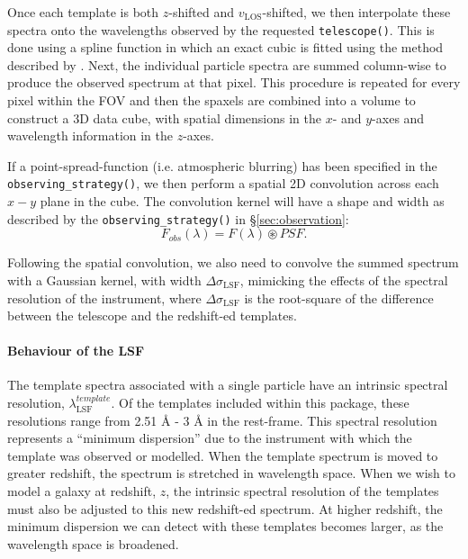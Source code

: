 \documentclass[
  journal=pasa,
  manuscript=research-paper, %
  year=2020,
  volume=37,
]{cup-journal}
\newcommand{\telescope}[1]{\texttt{telescope()}#1}
\newcommand{\observingstrategy}[1]{\texttt{observing\_strategy()}#1}
\begin{document}
Once each template is both $z$-shifted and $v_{\text{LOS}}$-shifted, we then interpolate these spectra onto the wavelengths observed by the requested \telescope{}. 
This is done using a spline function in which an exact cubic is fitted using the method described by \citealt{Forsythe1977ComputerMethods}.
Next, the individual particle spectra are summed column-wise to produce the observed spectrum at that pixel. This procedure is repeated for every pixel within the FOV and then the spaxels are combined into a volume to construct a 3D data cube, with spatial dimensions in the $x$- and $y$-axes and wavelength information in the $z$-axes. 

If a point-spread-function (i.e. atmospheric blurring) has been specified in the \observingstrategy, we then perform a spatial 2D convolution across each $x-y$ plane in the cube.
The convolution kernel will have a shape and width as described by the \observingstrategy{}  in \S \ref{sec:observation}:
\begin{equation}
    F_{obs}(\lambda) = F(\lambda) \circledast PSF.
\end{equation}

Following the spatial convolution, we also need to convolve the summed spectrum with a Gaussian kernel, with width $\Delta \sigma_{\text{LSF}}$, mimicking the effects of the spectral resolution of the instrument, where $\Delta \sigma_{\text{LSF}}$ is the root-square of the difference between the telescope and the redshift-ed templates. 

\paragraph{Behaviour of the LSF}

\noindent The template spectra associated with a single particle have an intrinsic spectral resolution, $\lambda_{\text{LSF}}^{template}$. 
Of the templates included within this package, these resolutions range from 2.51 \AA{} - 3 \AA{} in the rest-frame.
This spectral resolution represents a ``minimum dispersion'' due to the instrument with which the template was observed or modelled. 
When the template spectrum is moved to greater redshift, the spectrum is stretched in wavelength space. 
When we wish to model a galaxy at redshift, $z$, the intrinsic spectral resolution of the templates must also be adjusted to this new redshift-ed spectrum. 
At higher redshift, the minimum dispersion we can detect with these templates becomes larger, as the wavelength space is broadened.
\end{document}
